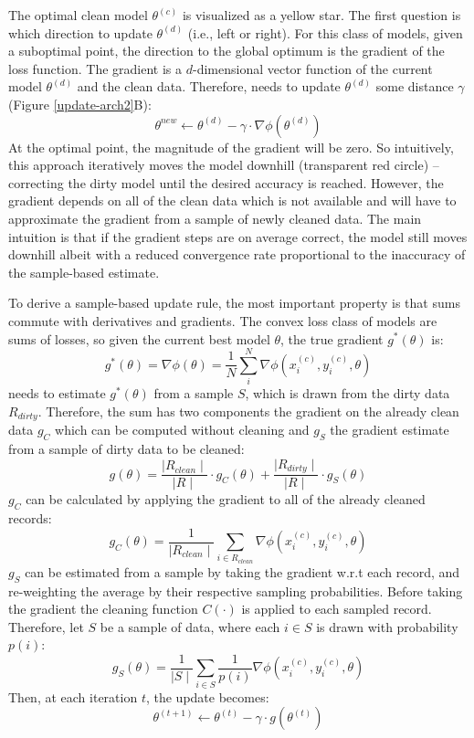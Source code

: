 The optimal clean model $\theta^{(c)}$ is visualized as a yellow star.
The first question is which direction to update $\theta^{(d)}$ (i.e., left or right).
For this class of models, given a suboptimal point, the direction to 
the global optimum is the gradient of the loss function.
The gradient is a $d$-dimensional vector function of the current model $\theta^{(d)}$ and the clean data.
Therefore, \sys needs to update $\theta^{(d)}$ some distance $\gamma$ (Figure \ref{update-arch2}B):
\[
\theta^{new} \leftarrow \theta^{(d)} - \gamma \cdot \nabla\phi(\theta^{(d)})
\]
At the optimal point, the magnitude of the gradient will be zero.
So intuitively, this approach iteratively moves the model downhill (transparent red circle) -- correcting the dirty model until the desired accuracy is reached.
However, the gradient depends on all of the clean data which is not available and \sys will have to approximate the gradient from a sample of newly cleaned data.
The main intuition is that if the gradient steps are on average correct, the model still moves downhill albeit with a reduced convergence rate proportional to the inaccuracy of the sample-based estimate.

To derive a sample-based update rule, the most important property is that sums commute with derivatives and gradients.
The convex loss class of models are sums of losses, so given the current best model $\theta$, the true gradient $g^*(\theta)$ is:
\[
g^*(\theta) = \nabla\phi(\theta) = \frac{1}{N} \sum_i^N \nabla\phi(x_i^{(c)},y_i^{(c)},\theta)
\]
\sys needs to estimate $g^*(\theta)$ from a sample $S$, which is drawn from the dirty data $R_{dirty}$.
 Therefore, the sum has two components the gradient on the already clean data $g_C$ which can be computed without cleaning and $g_S$ the gradient estimate from a sample of dirty data to be cleaned:
\[
g(\theta) = \frac{\mid R_{clean} \mid}{\mid R \mid} \cdot g_C(\theta) + \frac{\mid R_{dirty} \mid}{\mid R \mid} \cdot g_S(\theta)
\]
$g_C$ can be calculated by applying the gradient to all of the already cleaned records:
\[
g_C(\theta) = \frac{1}{\mid R_{clean}\mid}\sum_{i \in R_{clean}}\nabla\phi(x_i^{(c)},y_i^{(c)},\theta)
\]
$g_S$ can be estimated from a sample by taking the gradient w.r.t each record, and re-weighting the average by their respective sampling probabilities.
Before taking the gradient the cleaning function $C(\cdot)$ is applied to each sampled record.
Therefore, let $S$ be a sample of data, where each $i \in S$ is drawn with probability $p(i)$:
\[
g_{S}(\theta) = \frac{1}{\mid S \mid} \sum_{i \in S}\frac{1}{p(i)}\nabla\phi(x_i^{(c)},y_i^{(c)},\theta)
\]
Then, at each iteration $t$, the update becomes:
\[
\theta^{(t+1)} \leftarrow \theta^{(t)} - \gamma \cdot g(\theta^{(t)})
\]

